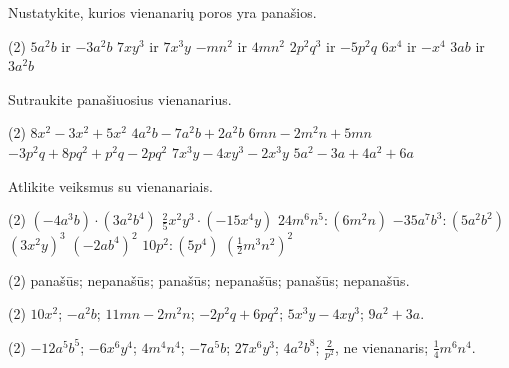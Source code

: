 \documentclass[11pt,a4paper]{scrartcl}
\begin{document}
\begin{problem}
Nustatykite, kurios vienanarių poros yra panašios.

\begin{tasks}[label={(\arabic*)}, label-offset=0.9em](2)
	\task $5a^2b$ ir $-3a^2b$
	\task $7xy^3$ ir $7x^3y$
	\task $-mn^2$ ir $4mn^2$
	\task $2p^2q^3$ ir $-5p^2q$
	\task $6x^4$ ir $-x^4$
	\task $3ab$ ir $3a^2b$
\end{tasks}
\end{problem}

\begin{problem}
Sutraukite panašiuosius vienanarius.

\begin{tasks}[label={(\arabic*)}, label-offset=0.9em](2)
	\task $8x^2-3x^2+5x^2$
	\task $4a^2b-7a^2b+2a^2b$
	\task $6mn-2m^2n+5mn$
	\task $-3p^2q+8pq^2+p^2q-2pq^2$
	\task $7x^3y-4xy^3-2x^3y$
	\task $5a^2-3a+4a^2+6a$
\end{tasks}
\end{problem}

\begin{problem}
Atlikite veiksmus su vienanariais.

\begin{tasks}[label={(\arabic*)}, label-offset=0.9em](2)
	\task $(-4a^3b)\cdot(3a^2b^4)$
	\task $\frac{2}{5}x^2y^3\cdot(-15x^4y)$
	\task $24m^6n^5:(6m^2n)$
	\task $-35a^7b^3:(5a^2b^2)$
	\task $(3x^2y)^3$
	\task $(-2ab^4)^2$
	\task $10p^2:(5p^4)$
	\task $(\frac{1}{2}m^3n^2)^2$
\end{tasks}
\end{problem}

\newpage
\answerssection

\begin{problem} \phantom{text}
\begin{tasks}[label={(\arabic*)}, label-offset=0.9em](2)
	\task panašūs;
	\task nepanašūs;
	\task panašūs;
	\task nepanašūs;
	\task panašūs;
	\task nepanašūs.
\end{tasks}
\end{problem}

\begin{problem} \phantom{text}
\begin{tasks}[label={(\arabic*)}, label-offset=0.9em](2)
	\task $10x^2$;
	\task $-a^2b$;
	\task $11mn-2m^2n$;
	\task $-2p^2q+6pq^2$;
	\task $5x^3y-4xy^3$;
	\task $9a^2+3a$.
\end{tasks}
\end{problem}

\begin{problem} \phantom{text}
\begin{tasks}[label={(\arabic*)}, label-offset=0.9em](2)
	\task $-12a^5b^5$;
	\task $-6x^6y^4$;
	\task $4m^4n^4$;
	\task $-7a^5b$;
	\task $27x^6y^3$;
	\task $4a^2b^8$;
	\task $\frac{2}{p^2}$, ne vienanaris;
	\task $\frac{1}{4}m^6n^4$.
\end{tasks}
\end{problem}
\end{document}
